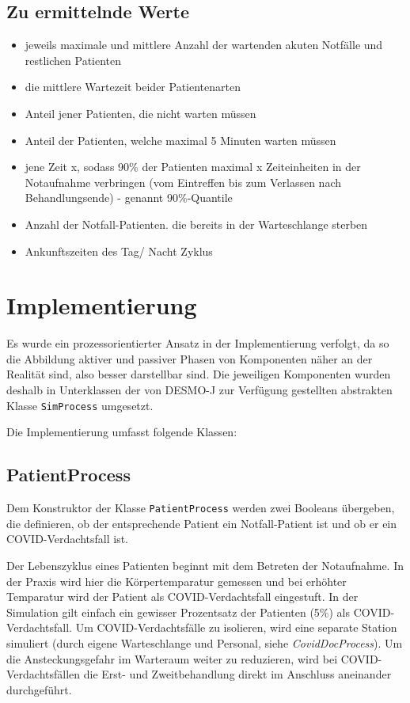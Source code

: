 \documentclass{article}
\begin{document}
\subsection{Zu ermittelnde Werte}
\begin{itemize}
    \item jeweils maximale und mittlere Anzahl der wartenden akuten Notfälle und restlichen Patienten
    \item die mittlere Wartezeit beider Patientenarten
    \item Anteil jener Patienten, die nicht warten müssen
    \item Anteil der Patienten, welche maximal 5 Minuten warten müssen
    \item jene Zeit x, sodass 90\% der Patienten maximal x Zeiteinheiten in der Notaufnahme verbringen (vom Eintreffen bis zum Verlassen nach Behandlungsende) - genannt 90\%-Quantile
    \item Anzahl der Notfall-Patienten. die bereits in der Warteschlange sterben
    \item Ankunftszeiten des Tag/ Nacht Zyklus
\end{itemize}

\section{Implementierung}

Es wurde ein prozessorientierter Ansatz in der Implementierung verfolgt, da so die Abbildung aktiver und passiver Phasen von Komponenten näher an der Realität sind, also besser darstellbar sind. Die jeweiligen Komponenten wurden deshalb in Unterklassen der von DESMO-J zur Verfügung gestellten abstrakten Klasse \texttt{SimProcess} umgesetzt.

Die Implementierung umfasst folgende Klassen:

\subsection{PatientProcess}
Dem Konstruktor der Klasse \texttt{PatientProcess} werden zwei Booleans übergeben,
die definieren, ob der entsprechende Patient ein Notfall-Patient ist und ob er ein COVID-Verdachtsfall ist.

Der Lebenszyklus eines Patienten beginnt mit dem Betreten der Notaufnahme.
In der Praxis wird hier die Körpertemparatur gemessen und bei erhöhter Temparatur wird der Patient als COVID-Verdachtsfall eingestuft.
In der Simulation gilt einfach ein gewisser Prozentsatz der Patienten (5\%) als COVID-Verdachtsfall.
Um COVID-Verdachtsfälle zu isolieren, wird eine separate Station simuliert (durch eigene Warteschlange und Personal, siehe \textit{CovidDocProcess}).
Um die Ansteckungsgefahr im Warteraum weiter zu reduzieren,
wird bei COVID-Verdachtsfällen die Erst- und Zweitbehandlung direkt im Anschluss aneinander durchgeführt.
\end{document}
